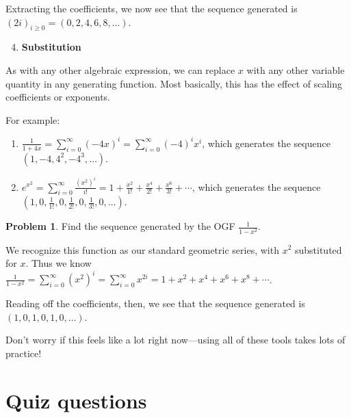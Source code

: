 \documentclass{article}
\theoremstyle{definition}
\newtheorem{problem}{Problem}
\begin{document}
Extracting the coefficients, we now see that the sequence generated is $(2 i)_{i \geq 0}=(0,2,4,6,8, \ldots)$.

\begin{enumerate}
\setcounter{enumi}{3}
\item \textbf{Substitution}
\end{enumerate}

As with any other algebraic expression, we can replace $x$ with any other variable quantity in any generating function. Most basically, this has the effect of scaling coefficients or exponents.

For example:
\begin{enumerate}[label=(\alph*)]
\item $\frac{1}{1+4 x}=\sum_{i=0}^{\infty}(-4 x)^{i}=\sum_{i=0}^{\infty}(-4)^{i} x^{i}$, which generates the sequence $\left(1,-4,4^{2},-4^{3}, \ldots\right)$.
\item $e^{x^{2}}=\sum_{i=0}^{\infty} \frac{\left(x^{2}\right)^{i}}{i!}=1+\frac{x^{2}}{1!}+\frac{x^{4}}{2!}+\frac{x^{6}}{3!}+\cdots$, which generates the sequence $\left(1,0, \frac{1}{1!}, 0, \frac{1}{2!}, 0, \frac{1}{3!}, 0, \ldots\right)$.
\end{enumerate}

\begin{problem}
Find the sequence generated by the OGF $\frac{1}{1-x^{2}}$.
\end{problem}

We recognize this function as our standard geometric series, with $x^{2}$ substituted for $x$. Thus we know $\frac{1}{1-x^{2}}=\sum_{i=0}^{\infty}\left(x^{2}\right)^{i}=\sum_{i=0}^{\infty} x^{2 i}=1+x^{2}+x^{4}+x^{6}+x^{8}+\cdots$.

Reading off the coefficients, then, we see that the sequence generated is $(1,0,1,0,1,0, \ldots)$.

Don't worry if this feels like a lot right now---using all of these tools takes lots of practice!











\newpage
\section*{Quiz questions}
\end{document}
